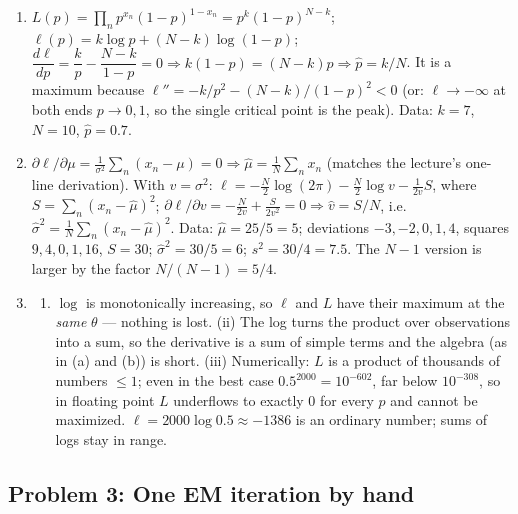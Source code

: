 \documentclass[
  11pt,
]{article}
\providecommand{\tightlist}{%
  \setlength{\itemsep}{0pt}\setlength{\parskip}{0pt}}
\newcommand{\answerspace}[1]{\par\vspace*{#1}}  %
\newcommand{\answerpage}{\clearpage}
\begin{document}
\answerspace{2.2in}

\begin{solutionbox}

\begin{enumerate}
\def\labelenumi{(\alph{enumi})}
\item
  \(L(p) = \prod_n p^{x_n}(1-p)^{1-x_n} = p^k(1-p)^{N-k}\);
  \(\ell(p) = k\log p + (N-k)\log(1-p)\);
  \(\dfrac{d\ell}{dp} = \dfrac kp - \dfrac{N-k}{1-p} = 0 \Rightarrow k(1-p) = (N-k)p
  \Rightarrow \hat p = k/N\). It is a maximum because
  \(\ell'' = -k/p^2 - (N-k)/(1-p)^2 < 0\) (or: \(\ell\to-\infty\) at
  both ends \(p\to0,1\), so the single critical point is the peak).
  Data: \(k = 7\), \(N = 10\), \(\hat p = 0.7\).
\item
  \(\partial\ell/\partial\mu = \frac{1}{\sigma^2}\sum_n (x_n-\mu) = 0 \Rightarrow
  \hat\mu = \frac1N\sum_n x_n\) (matches the lecture's one-line
  derivation). With \(v=\sigma^2\):
  \(\ell = -\frac N2\log(2\pi) - \frac N2\log v - \frac{1}{2v}S\), where
  \(S = \sum_n(x_n-\hat\mu)^2\);
  \(\partial\ell/\partial v = -\frac{N}{2v} +
  \frac{S}{2v^2} = 0 \Rightarrow \hat v = S/N\),
  i.e.~\(\hat\sigma^2 = \frac1N\sum_n
  (x_n-\hat\mu)^2\). Data: \(\hat\mu = 25/5 = 5\); deviations
  \(-3,-2,0,1,4\), squares \(9,4,0,1,16\), \(S = 30\);
  \(\hat\sigma^2 = 30/5 = 6\); \(s^2 = 30/4 = 7.5\). The \(N-1\) version
  is larger by the factor \(N/(N-1) = 5/4\).
\item
  \begin{enumerate}
  \def\labelenumii{(\roman{enumii})}
  \tightlist
  \item
    \(\log\) is monotonically increasing, so \(\ell\) and \(L\) have
    their maximum at the \emph{same} \(\theta\) --- nothing is lost.
    (ii) The log turns the product over observations into a sum, so the
    derivative is a sum of simple terms and the algebra (as in (a) and
    (b)) is short. (iii) Numerically: \(L\) is a product of thousands of
    numbers \(\le 1\); even in the best case \(0.5^{2000} = 10^{-602}\),
    far below \(10^{-308}\), so in floating point \(L\) underflows to
    exactly \(0\) for every \(p\) and cannot be maximized.
    \(\ell = 2000\log 0.5 \approx -1386\) is an ordinary number; sums of
    logs stay in range.
  \end{enumerate}
\end{enumerate}

\end{solutionbox}

\answerpage

\subsection{Problem 3: One EM iteration by
hand}\label{problem-3-one-em-iteration-by-hand}
\end{document}
